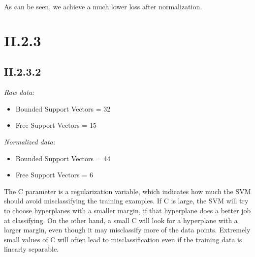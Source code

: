 \documentclass[12pt, a4paper]{article}
\begin{document}
As can be seen, we achieve a much lower loss after normalization.

\section*{II.2.3}

\subsection{II.2.3.2}

\textit{Raw data:}
\begin{itemize}
	\item Bounded Support Vectors = 32
	\item Free Support Vectors = 15
\end{itemize}

\textit{Normalized data:}
\begin{itemize}
	\item Bounded Support Vectors = 44
	\item Free Support Vectors = 6
\end{itemize}

The C parameter is a regularization variable, which indicates how much the SVM should avoid misclassifying the training examples. If C is large, the SVM will try to choose hyperplanes with a smaller margin, if that hyperplane does a better job at classifying. On the other hand, a small C will look for a hyperplane with a larger margin, even though it may misclassify more of the data points. Extremely small values of C will often lead to misclassification even if the training data is linearly separable.
\end{document}
